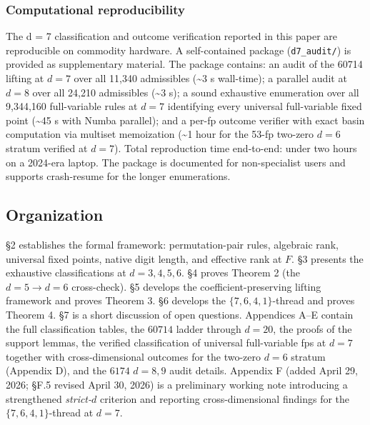 \documentclass[11pt,letterpaper]{article}
\theoremstyle{paperstyle}
\theoremstyle{paperstyledef}
\theoremstyle{paperstylerem}
\begin{document}
\hypertarget{computational-reproducibility}{%
\subsubsection{Computational reproducibility}\label{computational-reproducibility}}

The d = 7 classification and outcome verification reported in this paper
are reproducible on commodity hardware. A self-contained package
(\texttt{d7\_audit/}) is provided as supplementary material. The package
contains: an audit of the 60714 lifting at \(d = 7\) over all 11,340
admissibles (\textasciitilde3 s wall-time); a parallel audit at
\(d = 8\) over all 24,210 admissibles (\textasciitilde3 s); a sound
exhaustive enumeration over all 9,344,160 full-variable rules at
\(d = 7\) identifying every universal full-variable fixed point
(\textasciitilde45 s with Numba parallel); and a per-fp outcome verifier
with exact basin computation via multiset memoization (\textasciitilde1
hour for the 53-fp two-zero \(d = 6\) stratum verified at \(d = 7\)).
Total reproduction time end-to-end: under two hours on a 2024-era
laptop. The package is documented for non-specialist users and supports
crash-resume for the longer enumerations.

\hypertarget{organization}{%
\subsection{Organization}\label{organization}}

§2 establishes the formal framework: permutation-pair rules, algebraic
rank, universal fixed points, native digit length, and effective rank at
\(F\). §3 presents the exhaustive classifications at \(d = 3, 4, 5, 6\).
§4 proves Theorem 2 (the \(d = 5 \to d = 6\) cross-check). §5 develops
the coefficient-preserving lifting framework and proves Theorem 3. §6
develops the \(\{7, 6, 4, 1\}\)-thread and proves Theorem 4. §7 is a
short discussion of open questions. Appendices A--E contain the full
classification tables, the \(60714\) ladder through \(d = 20\), the
proofs of the support lemmas, the verified classification of universal
full-variable fps at \(d = 7\) together with cross-dimensional outcomes
for the two-zero \(d = 6\) stratum (Appendix D), and the \(6174\)
\(d = 8, 9\) audit details. Appendix F (added April 29, 2026; §F.5
revised April 30, 2026) is a preliminary working note introducing a
strengthened \emph{strict-\(d\)} criterion and reporting
cross-dimensional findings for the \(\{7, 6, 4, 1\}\)-thread at
\(d = 7\).
\end{document}
